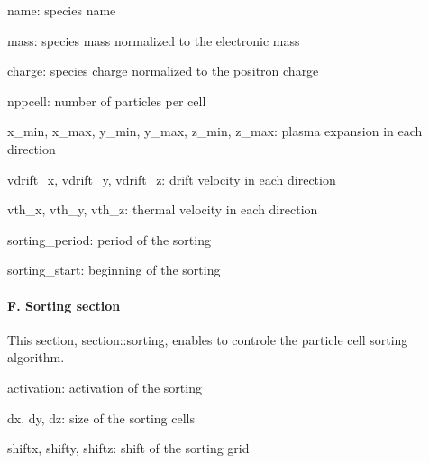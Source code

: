 \begin{DoxyItemize}
\item {\ttfamily name}\+: species name
\item {\ttfamily mass}\+: species mass normalized to the electronic mass
\item {\ttfamily charge}\+: species charge normalized to the positron charge
\item {\ttfamily nppcell}\+: number of particles per cell
\item {\ttfamily x\+\_\+min}, {\ttfamily x\+\_\+max}, {\ttfamily y\+\_\+min}, {\ttfamily y\+\_\+max}, {\ttfamily z\+\_\+min}, {\ttfamily z\+\_\+max}\+: plasma expansion in each direction
\item {\ttfamily vdrift\+\_\+x}, {\ttfamily vdrift\+\_\+y}, {\ttfamily vdrift\+\_\+z}\+: drift velocity in each direction
\item {\ttfamily vth\+\_\+x}, {\ttfamily vth\+\_\+y}, {\ttfamily vth\+\_\+z}\+: thermal velocity in each direction
\item {\ttfamily sorting\+\_\+period}\+: period of the sorting
\item {\ttfamily sorting\+\_\+start}\+: beginning of the sorting
\end{DoxyItemize}

\paragraph*{F. Sorting section}

This section, {\ttfamily section\+::sorting}, enables to controle the particle cell sorting algorithm.


\begin{DoxyItemize}
\item {\ttfamily activation}\+: activation of the sorting
\item {\ttfamily dx}, {\ttfamily dy}, {\ttfamily dz}\+: size of the sorting cells
\item {\ttfamily shiftx}, {\ttfamily shifty}, {\ttfamily shiftz}\+: shift of the sorting grid 
\end{DoxyItemize}